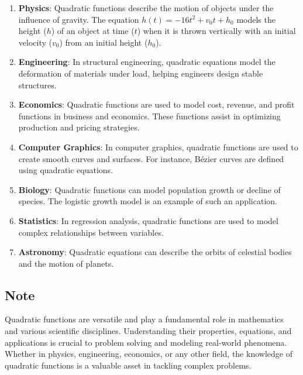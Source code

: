 \documentclass[12pt,a4paper]{article}
\begin{document}
\begin{enumerate}
    \item \textbf{Physics}: Quadratic functions describe the motion of objects under the influence of gravity. The equation $h(t) = -16t^2 + v_0t + h_0$ models the height ($h$) of an object at time ($t$) when it is thrown vertically with an initial velocity ($v_0$) from an initial height ($h_0$).

    \item \textbf{Engineering}: In structural engineering, quadratic equations model the deformation of materials under load, helping engineers design stable structures.

    \item \textbf{Economics}: Quadratic functions are used to model cost, revenue, and profit functions in business and economics. These functions assist in optimizing production and pricing strategies.

    \item \textbf{Computer Graphics}: In computer graphics, quadratic functions are used to create smooth curves and surfaces. For instance, Bézier curves are defined using quadratic equations.

    \item \textbf{Biology}: Quadratic functions can model population growth or decline of species. The logistic growth model is an example of such an application.

    \item \textbf{Statistics}: In regression analysis, quadratic functions are used to model complex relationships between variables.

    \item \textbf{Astronomy}: Quadratic equations can describe the orbits of celestial bodies and the motion of planets.

\end{enumerate}

\subsection*{Note}

Quadratic functions are versatile and play a fundamental role in mathematics and various scientific disciplines. Understanding their properties, equations, and applications is crucial to problem solving and modeling real-world phenomena. Whether in physics, engineering, economics, or any other field, the knowledge of quadratic functions is a valuable asset in tackling complex problems.
\end{document}
